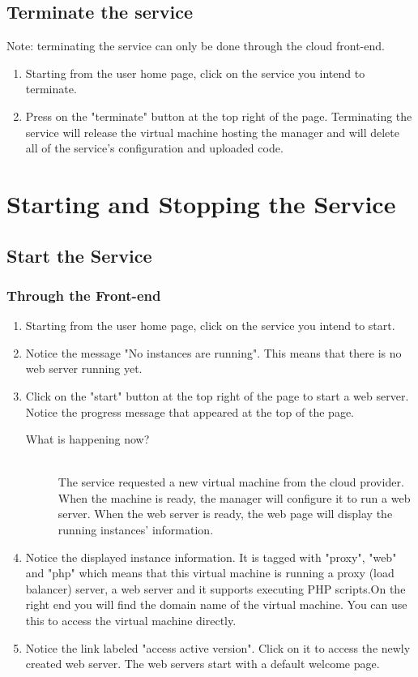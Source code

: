 \documentclass[12pt]{article}
\newenvironment{what}
{\begin{description} \item [What is happening now?] \hfill \\}
{\end{description}}
\begin{document}
\subsection{Terminate the service}
Note: terminating the service can only be done through the cloud front-end.
\begin{enumerate}
\item Starting from the user home page, click on the service you intend to
      terminate.
\item Press on the "terminate" button at the top right of the page.
      Terminating the service will release the virtual machine hosting
      the manager and will delete all of the service's configuration and
      uploaded code.
\end{enumerate}

\section{Starting and Stopping the Service}

\subsection{Start the Service}
\subsubsection{Through the Front-end}
\begin{enumerate}
\item Starting from the user home page, click on the service you intend to start.
\item Notice the message "No instances are running". This means that there is no
      web server running yet.
\item Click on the "start" button at the top right
      of the page to start a web server. Notice the progress message that
      appeared at the top of the page.
      \begin{what}
        The service requested a new virtual machine from the cloud provider.
        When the machine is ready, the manager will configure it to run
        a web server. When the web server is ready, the web page will
        display the running instances' information.
      \end{what}
\item Notice the displayed instance information. It is tagged with "proxy",
      "web" and "php" which means that this virtual machine is running a proxy
      (load balancer) server, a web server and it supports executing PHP
      scripts.On the right end you will find the domain name of the virtual
      machine. You can use this to access the virtual machine directly.
\item Notice the link labeled "access active version". Click on it to access
      the newly created web server. The web servers start with a default
      welcome page.
\end{enumerate}
\end{document}
